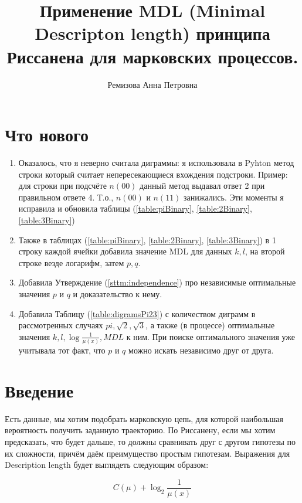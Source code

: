 \documentclass[12pt]{article}
\begin{document}
	\title{Применение MDL (Minimal Descripton length) принципа Риссанена для марковских процессов.}
	\author{Ремизова Анна Петровна}
	\maketitle
	
	\section*{Что нового}
	\begin{enumerate}
		\item Оказалось, что я неверно считала диграммы: я использовала в Pyhton метод строки  который считает непересекающиеся вхождения подстроки. Пример: для строки  при подсчёте $n(00)$ данный метод выдавал ответ 2 при правильном ответе 4. Т.о., $n(00)$ и $n(11)$ занижались. Эти моменты я исправила и обновила таблицы (\ref{table:piBinary}, \ref{table:2Binary}, \ref{table:3Binary})
		\item Также в таблицах (\ref{table:piBinary}, \ref{table:2Binary}, \ref{table:3Binary}) в 1 строку каждой ячейки добавила значение MDL для данных $k, l$, на второй строке везде логарифм, затем $p, q$.
		\item Добавила Утверждение (\ref{sttm:independence}) про независимые оптимальные значения $p$ и $q$ и доказательство к нему.
		\item Добавила Таблицу (\ref{table:digramsPi23}) с количеством диграмм в рассмотренных случаях $pi, \sqrt{2}, \sqrt{3}$, а также (в процессе) оптимальные значения $\displaystyle k,l,\log{\frac{1}{\mu(x)}}, MDL$ к ним. При поиске оптимального значения уже учитывала тот факт, что $p$ и $q$ можно искать независимо друг от друга.
	\end{enumerate}
	
	\section*{Введение}
	 Есть данные, мы хотим подобрать марковскую цепь, для которой наибольшая вероятность получить заданную траекторию. По Риссанену, если мы хотим предсказать, что будет дальше, то должны сравнивать друг с другом гипотезы по их сложности, причём даём преимущество простым гипотезам. Выражения для Description length будет выглядеть следующим образом:
	
	\begin{equation}C(\mu)+\log_2{\frac{1}{\mu(x)}}\end{equation}
	
\end{document}
